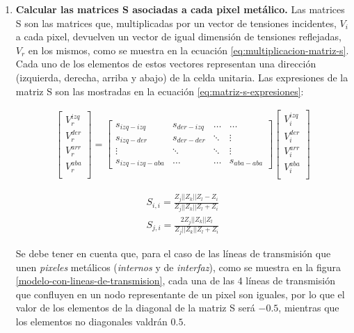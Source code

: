\begin{enumerate}
	\item \textbf{Calcular las matrices S asociadas a cada pixel metálico.} Las matrices S son las matrices que, multiplicadas por un vector de tensiones incidentes, $V_i$ a cada pixel, devuelven un vector de igual dimensión de tensiones reflejadas, $V_r$ en los mismos, como se muestra en la ecuación \ref{eq:multiplicacion-matriz-s}. Cada uno de los elementos de estos vectores representan una dirección (izquierda, derecha, arriba y abajo) de la celda unitaria. Las expresiones de la matriz S son las mostradas en la ecuación \ref{eq:matriz-s-expresiones}:
	
	\begin{align}
		\label{eq:multiplicacion-matriz-s}
		\begin{bmatrix}
			V_r^{izq} \\
			V_r^{der} \\
			V_r^{arr} \\
			V_r^{aba} \\
		\end{bmatrix}
			=
		\begin{bmatrix}
			s_{izq-izq} & s_{der-izq} & \dots & \dots \\
			s_{izq-der} & s_{der-der} & \ddots & \vdots \\
			\vdots & \ddots & \ddots     & \vdots \\
			s_{izq-izq-aba} & \dots & \dots & s_{aba-aba}
		\end{bmatrix}
		\begin{bmatrix}
			V_i^{izq} \\
			V_i^{der} \\
			V_i^{arr} \\
			V_i^{aba} \\
		\end{bmatrix}
	\end{align}
	
	\begin{subequations}
		\label{eq:matriz-s-expresiones}
		\begin{align}
			S_{i,i} = \frac{Z_{j}||Z_{k}||Z_{l} -Z_{i}}{Z_{j}||Z_{k}||Z_{l} +Z_{i}} \\
			S_{j,i} = \frac{2 Z_{j}||Z_{k}||Z_{l}}{Z_{j}||Z_{k}||Z_{l} +Z_{i}}
		\end{align}
	\end{subequations}
	
	Se debe tener en cuenta que, para el caso de las líneas de transmisión que unen \textit{pixeles} metálicos (\textit{internos} y de \textit{interfaz}), como se muestra en la figura \ref{modelo-con-lineas-de-transmision}, cada una de las 4 líneas de transmisión que confluyen en un nodo representante de un pixel son iguales, por lo que el valor de los elementos de la diagonal de la matriz S será $-0.5$, mientras que los elementos no diagonales valdrán $0.5$.
	

\end{enumerate}
